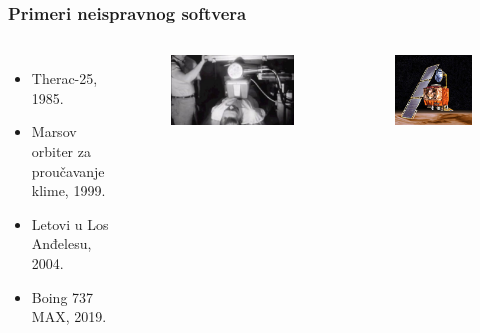 \documentclass{beamer}
\begin{document}
\begin{frame}
\frametitle{Primeri neispravnog softvera}

\begin{columns}[c]

\begin{itemize}
\item Therac-25, 1985.
\item Marsov orbiter za proučavanje klime, 1999.
\item Letovi u Los Anđelesu, 2004.
\item Boing 737 MAX, 2019.
\end{itemize}


\begin{figure}
\includegraphics[width=1\linewidth]{therac.jpg}
\end{figure}

\begin{figure}
\includegraphics[width=1\linewidth]{MCO.jpg}
\end{figure}

\end{columns}
\end{frame}
\end{document}
